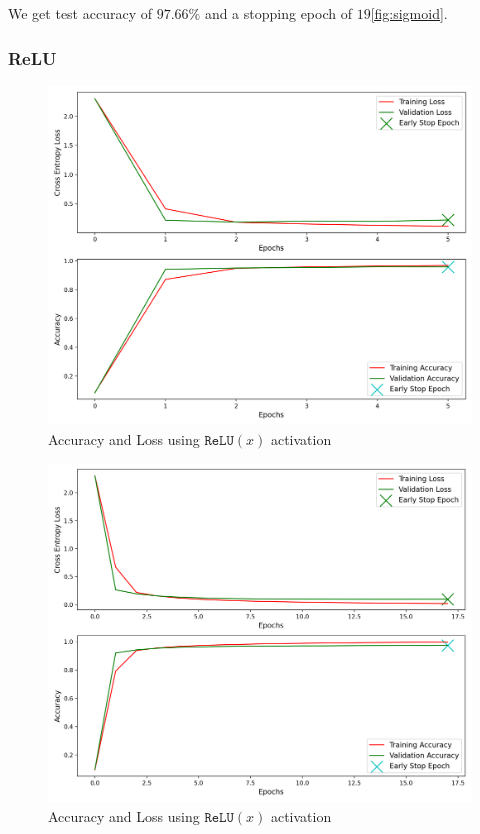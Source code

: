 We get test accuracy of $97.66\%$ and a stopping epoch of $19$\cref{fig:sigmoid}.

\subsubsection{ReLU}

\begin{figure}[!ht]
	\centering
	\includegraphics[width=1.0\textwidth]{./images/activation_relu.png}
	\caption{Accuracy and Loss using $\texttt{ReLU}(x)$ activation}
	\label{fig:relu}
\end{figure}

\begin{figure}[!ht]
	\centering
	\includegraphics[width=1.0\textwidth]{./images/activation_relu2.png}
	\caption{Accuracy and Loss using $\texttt{ReLU}(x)$ activation}
	\label{fig:relu2}
\end{figure}

